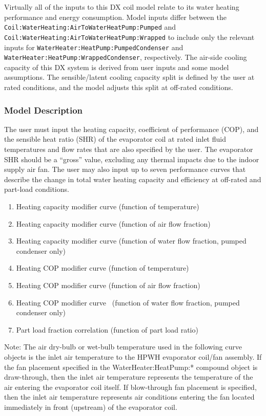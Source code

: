 Virtually all of the inputs to this DX coil model relate to its water heating performance and energy consumption. Model inputs differ between the \lstinline!Coil:WaterHeating:AirToWaterHeatPump:Pumped! and \lstinline!Coil:WaterHeating:AirToWaterHeatPump:Wrapped! to include only the relevant inputs for \lstinline!WaterHeater:HeatPump:PumpedCondenser! and \lstinline!WaterHeater:HeatPump:WrappedCondenser!, respectively. The air-side cooling capacity of this DX system is derived from user inputs and some model assumptions. The sensible/latent cooling capacity split is defined by the user at rated conditions, and the model adjusts this split at off-rated conditions.

\subsubsection{Model Description}\label{model-description-8}

The user must input the heating capacity, coefficient of performance (COP), and the sensible heat ratio (SHR) of the evaporator coil at rated inlet fluid temperatures and flow rates that are also specified by the user. The evaporator SHR should be a ``gross'' value, excluding any thermal impacts due to the indoor supply air fan. The user may also input up to seven performance curves that describe the change in total water heating capacity and efficiency at off-rated and part-load conditions.

\begin{enumerate}
\item Heating capacity modifier curve (function of temperature)
\item Heating capacity modifier curve (function of air flow fraction)
\item Heating capacity modifier curve (function of water flow fraction, pumped condenser only)
\item Heating COP modifier curve (function of temperature)
\item Heating COP modifier curve (function of air flow fraction)
\item Heating COP modifier curve~ (function of water flow fraction, pumped condenser only)
\item Part load fraction correlation (function of part load ratio)
\end{enumerate}

Note: The air dry-bulb or wet-bulb temperature used in the following curve objects is the inlet air temperature to the HPWH evaporator coil/fan assembly. If the fan placement specified in the WaterHeater:HeatPump:* compound object is draw-through, then the inlet air temperature represents the temperature of the air entering the evaporator coil itself. If blow-through fan placement is specified, then the inlet air temperature represents air conditions entering the fan located immediately in front (upstream) of the evaporator coil.

